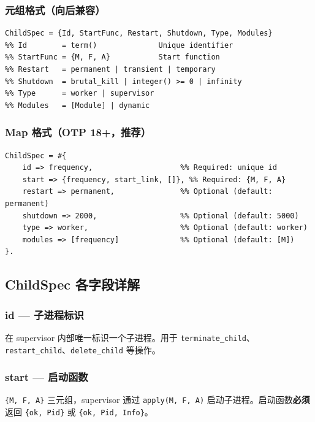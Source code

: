 \documentclass[a4paper,11pt]{article}
\begin{document}
\subsubsection{元组格式（向后兼容）}

\begin{lstlisting}[style=erlangstyle]
ChildSpec = {Id, StartFunc, Restart, Shutdown, Type, Modules}
%% Id        = term()              Unique identifier
%% StartFunc = {M, F, A}           Start function
%% Restart   = permanent | transient | temporary
%% Shutdown  = brutal_kill | integer() >= 0 | infinity
%% Type      = worker | supervisor
%% Modules   = [Module] | dynamic
\end{lstlisting}

\subsubsection{Map 格式（OTP 18+，推荐）}

\begin{lstlisting}[style=erlangstyle]
ChildSpec = #{
    id => frequency,                    %% Required: unique id
    start => {frequency, start_link, []}, %% Required: {M, F, A}
    restart => permanent,               %% Optional (default: permanent)
    shutdown => 2000,                   %% Optional (default: 5000)
    type => worker,                     %% Optional (default: worker)
    modules => [frequency]              %% Optional (default: [M])
}.
\end{lstlisting}

\subsection{ChildSpec 各字段详解}

\subsubsection{id --- 子进程标识}

在 supervisor 内部唯一标识一个子进程。用于 \texttt{terminate\_child}、\texttt{restart\_child}、\texttt{delete\_child} 等操作。

\subsubsection{start --- 启动函数}

\texttt{\{M, F, A\}} 三元组，supervisor 通过 \texttt{apply(M, F, A)} 启动子进程。启动函数\textbf{必须}返回 \texttt{\{ok, Pid\}} 或 \texttt{\{ok, Pid, Info\}}。
\end{document}
